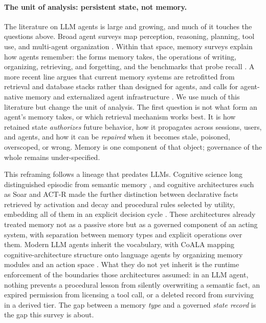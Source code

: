 \paragraph{The unit of analysis: persistent state, not memory.} The literature on LLM agents is large and growing, and much of it touches the questions above. Broad agent surveys map perception, reasoning, planning, tool use, and multi-agent organization \citep{xi2023riseandpotential,wang2023surveylargelanguagemodelagents}. Within that space, memory surveys explain how agents remember: the forms memory takes, the operations of writing, organizing, retrieving, and forgetting, and the benchmarks that probe recall \citep{zhang2024memorymechanism,du2026memoryautonomous,hu2025memoryageaiagents}. A more recent line argues that current memory systems are retrofitted from retrieval and database stacks rather than designed for agents, and calls for agent-native memory and externalized agent infrastructure \citep{zhou2026agentnative,zhou2026externalizationllmagentsunified}. We use much of this literature but change the unit of analysis. The first question is not what form an agent's memory takes, or which retrieval mechanism works best. It is how retained state \emph{authorizes} future behavior, how it propagates across sessions, users, and agents, and how it can be \emph{repaired} when it becomes stale, poisoned, overscoped, or wrong. Memory is one component of that object; governance of the whole remains under-specified.

This reframing follows a lineage that predates LLMs. Cognitive science long distinguished episodic from semantic memory \citep{tulving1972episodic}, and cognitive architectures such as Soar and ACT-R made the further distinction between declarative facts retrieved by activation and decay and procedural rules selected by utility, embedding all of them in an explicit decision cycle \citep{laird2012soar,anderson2004actr}. These architectures already treated memory not as a passive store but as a governed component of an acting system, with separation between memory types and explicit operations over them. Modern LLM agents inherit the vocabulary, with CoALA mapping cognitive-architecture structure onto language agents by organizing memory modules and an action space \citep{sumers2024cognitivearchitectureslanguageagents}. What they do not yet inherit is the runtime enforcement of the boundaries those architectures assumed: in an LLM agent, nothing prevents a procedural lesson from silently overwriting a semantic fact, an expired permission from licensing a tool call, or a deleted record from surviving in a derived tier. The gap between a memory \emph{type} and a governed \emph{state record} is the gap this survey is about.

